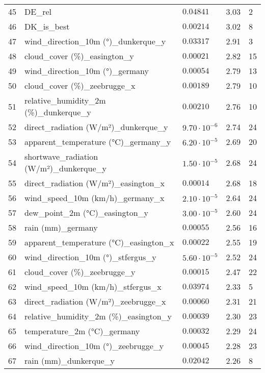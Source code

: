 \begin{table}[H]
\begin{tabular}{r l l l l}
        45 & DE\_rel & $0.04841$ & 3.03 & 2 \\
        46 & DK\_is\_best & $0.00214$ & 3.02 & 8 \\
        47 & wind\_direction\_10m (°)\_dunkerque\_y & $0.03317$ & 2.91 & 3 \\
        48 & cloud\_cover (\%)\_easington\_y & $0.00021$ & 2.82 & 15 \\
        49 & wind\_direction\_10m (°)\_germany & $0.00054$ & 2.79 & 13 \\
        50 & cloud\_cover (\%)\_zeebrugge\_x & $0.00189$ & 2.79 & 10 \\
        51 & relative\_humidity\_2m (\%)\_dunkerque\_y & $0.00210$ & 2.76 & 10 \\
        52 & direct\_radiation (W/m²)\_dunkerque\_y & $9.70 \cdot 10^{-6}$ & 2.74 & 24 \\
        53 & apparent\_temperature (°C)\_germany\_y & $6.20 \cdot 10^{-5}$ & 2.69 & 20 \\
        54 & shortwave\_radiation (W/m²)\_dunkerque\_y & $1.50 \cdot 10^{-5}$ & 2.68 & 24 \\
        55 & direct\_radiation (W/m²)\_easington\_x & $0.00014$ & 2.68 & 18 \\
        56 & wind\_speed\_10m (km/h)\_germany\_x & $2.10 \cdot 10^{-5}$ & 2.64 & 24 \\
        57 & dew\_point\_2m (°C)\_easington\_y & $3.00 \cdot 10^{-5}$ & 2.60 & 24 \\
        58 & rain (mm)\_germany & $0.00055$ & 2.56 & 16 \\
        59 & apparent\_temperature (°C)\_easington\_x & $0.00022$ & 2.55 & 19 \\
        60 & wind\_direction\_10m (°)\_stfergus\_y & $5.60 \cdot 10^{-5}$ & 2.52 & 24 \\
        61 & cloud\_cover (\%)\_zeebrugge\_y & $0.00015$ & 2.47 & 22 \\
        62 & wind\_speed\_10m (km/h)\_stfergus\_x & $0.03974$ & 2.33 & 5 \\
        63 & direct\_radiation (W/m²)\_zeebrugge\_x & $0.00060$ & 2.31 & 21 \\
        64 & relative\_humidity\_2m (\%)\_easington\_y & $0.00039$ & 2.30 & 23 \\
        65 & temperature\_2m (°C)\_germany & $0.00032$ & 2.29 & 24 \\
        66 & wind\_direction\_10m (°)\_zeebrugge\_y & $0.00045$ & 2.28 & 23 \\
        67 & rain (mm)\_dunkerque\_y & $0.02042$ & 2.26 & 8 \\

\end{tabular}
\end{table}
